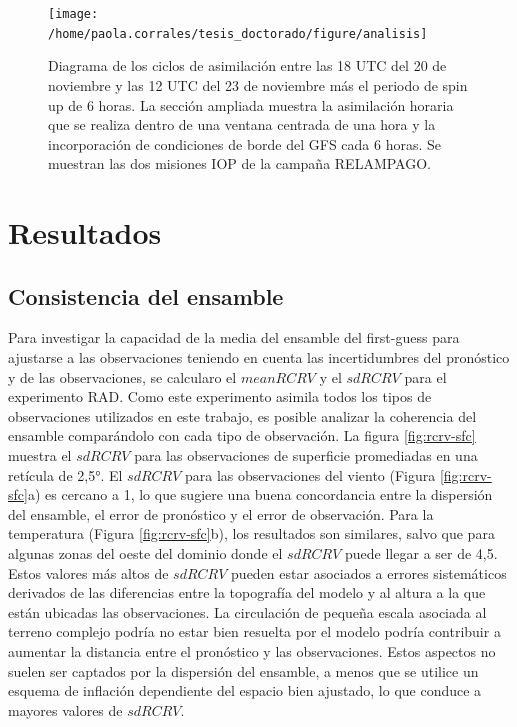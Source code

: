 \documentclass[12pt,oneside]{reedthesis}
\begin{document}
\begin{figure}
\texttt{[image: /home/paola.corrales/tesis\_doctorado/figure/analisis]} \caption{Diagrama de los ciclos de asimilación entre las 18 UTC del 20 de noviembre y las 12 UTC del 23 de noviembre más el periodo de spin up de 6 horas. La sección ampliada muestra la asimilación horaria que se realiza dentro de una ventana centrada de una hora y la incorporación de condiciones de borde del GFS cada 6 horas. Se muestran las dos misiones IOP de la campaña RELAMPAGO.}\label{fig:cycle}
\end{figure}
\hypertarget{resultados}{%
\section{Resultados}\label{resultados}}

\hypertarget{consistencia-del-ensamble}{%
\subsection{Consistencia del ensamble}\label{consistencia-del-ensamble}}

Para investigar la capacidad de la media del ensamble del first-guess para ajustarse a las observaciones teniendo en cuenta las incertidumbres del pronóstico y de las observaciones, se calcularo el \(meanRCRV\) y el \(sdRCRV\) para el experimento RAD. Como este experimento asimila todos los tipos de observaciones utilizados en este trabajo, es posible analizar la coherencia del ensamble comparándolo con cada tipo de observación. La figura \ref{fig:rcrv-sfc} muestra el \(sdRCRV\) para las observaciones de superficie promediadas en una retícula de 2,5°. El \(sdRCRV\) para las observaciones del viento (Figura \ref{fig:rcrv-sfc}a) es cercano a 1, lo que sugiere una buena concordancia entre la dispersión del ensamble, el error de pronóstico y el error de observación. Para la temperatura (Figura \ref{fig:rcrv-sfc}b), los resultados son similares, salvo que para algunas zonas del oeste del dominio donde el \(sdRCRV\) puede llegar a ser de 4,5. Estos valores más altos de \(sdRCRV\) pueden estar asociados a errores sistemáticos derivados de las diferencias entre la topografía del modelo y al altura a la que están ubicadas las observaciones. La circulación de pequeña escala asociada al terreno complejo podría no estar bien resuelta por el modelo podría contribuir a aumentar la distancia entre el pronóstico y las observaciones. Estos aspectos no suelen ser captados por la dispersión del ensamble, a menos que se utilice un esquema de inflación dependiente del espacio bien ajustado, lo que conduce a mayores valores de \(sdRCRV\).
\end{document}
